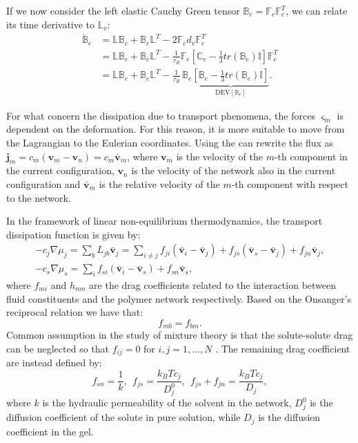 \documentclass[runningheads]{llncs}
\newcommand{\F}{\ensuremath{\mathbb{F}}}
\newcommand{\LL}{\ensuremath{\mathbb{L}}}
\begin{document}
If we now consider the left elastic Cauchy Green tensor $\mathbb{B}_e=\F_e \F^T_e$, we can relate its time derivative to $\LL_v$:
\begin{equation}
\begin{aligned}
\dot{\mathbb{B}}_e &= \LL \mathbb{B}_e + \mathbb{B}_e \LL^T - 2 \F_e d_v \F_e^{T} \\
&= \LL\mathbb{B}_e + \mathbb{B}_e \LL^T - \frac{1}{\tau_R} \F_e\left[\mathbb{C}_e-\frac{1}{3}tr(\mathbb{B}_e)\mathbb{I}\right]\F_e^T\\
&= \LL\mathbb{B}_e + \mathbb{B}_e \LL^T - \frac{1}{\tau_R} \,\mathbb{B}_e\underbrace{\left[\mathbb{B}_e-\frac{1}{3}tr(\mathbb{B}_e)\mathbb{I}\right]}_{\text{DEV}[\mathbb{B}_e]}.
\end{aligned}
\end{equation}

For what concern the dissipation due to transport phenomena, the forces $\varsigma_m$ is dependent on the deformation. For this reason, it is more suitable to move from the Lagrangian to the Eulerian coordinates.  Using the  can rewrite the flux as $\mathbf{j}_m = c_m (\mathbf{v}_m-\mathbf{v}_n)= c_m \bar{\mathbf{v}}_{m}$, where $\mathbf{v}_m$ is the velocity of the $m$-th component in the current configuration, $\mathbf{v}_n$ is the velocity of the network also in the current configuration and  $\bar{\mathbf{v}}_{m}$ is the relative velocity of the $m$-th component with respect to the network. 

In the framework of linear non-equilibrium thermodynamics, the transport dissipation function is given by:
\begin{eqnarray}
-c_j \nabla \mu_j = \sum_b L_{jb} \bar{\mathbf{v}}_j= \sum_{i\neq j} f_{ji} \left(\bar{\mathbf{v}}_i-\bar{\mathbf{v}}_j\right) + f_{js} (\bar{\mathbf{v}}_s-\bar{\mathbf{v}}_j) + f_{jn} \bar{\mathbf{v}}_j,\label{drag1}\\
-c_s \nabla \mu_s = \sum_i f_{si} \left(\bar{\mathbf{v}}_i-\bar{\mathbf{v}}_s\right)+ f_{sn} \bar{\mathbf{v}}_s,
\end{eqnarray}
where $f_{mi}$ and $h_{mn}$ are the drag coefficients related to the interaction between fluid constituents and the polymer network respectively. Based on the Onsanger's reciprocal relation we have that:
\begin{equation}
f_{mb}=f_{bm}.
\end{equation}
Common assumption in the study of mixture theory is that the solute-solute drag can be neglected so that $f_{ij}=0$ for $i,j=1,\ldots,N$ \cite{ecm1,biophysics}. The remaining drag coefficient are instead defined by:
\begin{equation}
f_{sn} = \frac{1}{k}, \ \ f_{js}=\frac{k_BT c_j}{D^0_{j}},\ \  f_{js}+f_{jn}= \frac{k_BT c_j}{D_j}, \label{drag2}
\end{equation}
where $k$ is the hydraulic permeability of the solvent in the network, $D^0_j$ is the diffusion coefficient of the solute in pure solution, while $D_j$ is the diffusion coefficient in the gel.
\end{document}
